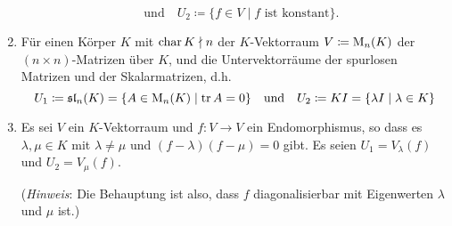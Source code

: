 \begin{question}[subtitle = Konstruktion idempotenter Endomorphismen]{3}
\begin{enumerate}[leftmargin=*]
\[        \quad\text{und}\quad
        U_2 \coloneqq \{f \in V \mid \text{$f$ ist konstant}\}.
      \]
%       
    \item
      Für einen Körper $K$ mit $\operatorname{char} K \nmid n$ der $K$-Vektorraum $V \coloneqq \operatorname{M}_n(K)$ der $(n \times n)$-Matrizen über $K$, und die Untervektorräume der spurlosen Matrizen und der Skalarmatrizen, d.h.\
      \[
        U_1 \coloneqq \mathfrak{sl}_n(K) = \{ A \in \operatorname{M}_n(K) \mid \operatorname{tr} A  = 0 \}
        \quad\text{und}\quad
        U_2 \coloneqq K I = \{ \lambda I \mid \lambda \in K \}
      \]
    \item
      Es sei $V$ ein $K$-Vektorraum und $f \colon V \to V$ ein Endomorphismus, so dass es $\lambda, \mu \in K$ mit $\lambda \neq \mu$ und $(f-\lambda)(f-\mu) = 0$ gibt.
      Es seien $U_1 = V_\lambda(f)$ und $U_2 = V_\mu(f)$.
      
      (\emph{Hinweis}:
       Die Behauptung ist also, dass $f$ diagonalisierbar mit Eigenwerten $\lambda$ und $\mu$ ist.)
  \end{enumerate}
\end{question}


